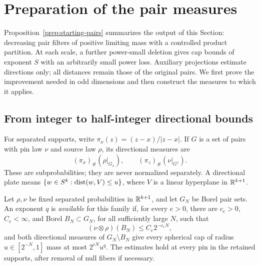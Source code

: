 \section{Preparation of the pair measures}\label{prep:section}

Proposition~\ref{prep:starting-pairs} summarizes the output of this
Section: decreasing pair filters of positive limiting mass with a
controlled product partition. At each scale, a further power-small
deletion gives cap bounds of exponent \(S\) with an arbitrarily small
power loss. Auxiliary projections estimate directions only; all
distances remain those of the original pairs. We first prove the
improvement needed in odd dimensions and then construct the measures
to which it applies.

\subsection{From integer to half-integer directional bounds}

For separated supports, write $\pi_x(z)=(z-x)/|z-x|$. If $G$ is a
set of pairs with pin law $\nu$ and source law $\rho$, its directional
measures are
\[
 (\pi_x)_\#(\rho|_{G_x}),\qquad
 (\pi_z)_\#(\nu|_{G^z}).
\]
These are subprobabilities; they are never normalized separately.
A directional plate means $\{w\in S^k:\operatorname{dist}(w,V)\le u\}$,
where $V$ is a linear hyperplane in $\mathbb R^{k+1}$.

\begin{definition}\label{prep:availability}
Let $\rho,\nu$ be fixed separated probabilities in $\mathbb R^{k+1}$, and
let $G_N$ be Borel pair sets. An exponent $q$ is \emph{available} for this
family if, for every $e>0$, there are $c_e>0$, $C_e<\infty$, and Borel
$B_N\subset G_N$, for all sufficiently large $N$, such that
\[
 (\nu\otimes\rho)(B_N)\le C_e2^{-c_eN},
\]
and both directional measures of $G_N\setminus B_N$ give every spherical
cap of radius $u\in[2^{-N},1]$ mass at most $2^{eN}u^q$.
The estimates hold at every pin in the retained supports, after removal of
null fibers if necessary.
\end{definition}

